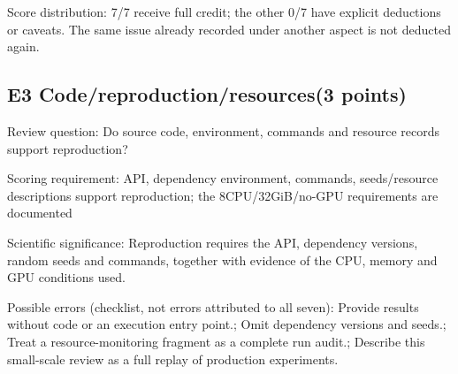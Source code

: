 \documentclass[11pt,a4paper]{article}
\begin{document}
Score distribution: 7/\allowbreak{}7 receive full credit; the other 0/\allowbreak{}7 have explicit deductions or caveats. The same issue already recorded under another aspect is not deducted again.

\clearpage
\subsection{E3 Code/\allowbreak{}reproduction/\allowbreak{}resources(3 points)}
\label{aspect:E3}
Review question: Do source code,\allowbreak{} environment,\allowbreak{} commands and resource records support reproduction?

Scoring requirement: API,\allowbreak{} dependency environment,\allowbreak{} commands,\allowbreak{} seeds/\allowbreak{}resource descriptions support reproduction; the 8CPU/\allowbreak{}32GiB/\allowbreak{}no-GPU requirements are documented

Scientific significance: Reproduction requires the API,\allowbreak{} dependency versions,\allowbreak{} random seeds and commands,\allowbreak{} together with evidence of the CPU,\allowbreak{} memory and GPU conditions used.

Possible errors (checklist,\allowbreak{} not errors attributed to all seven): Provide results without code or an execution entry point.; Omit dependency versions and seeds.; Treat a resource-monitoring fragment as a complete run audit.; Describe this small-scale review as a full replay of production experiments.
\end{document}
